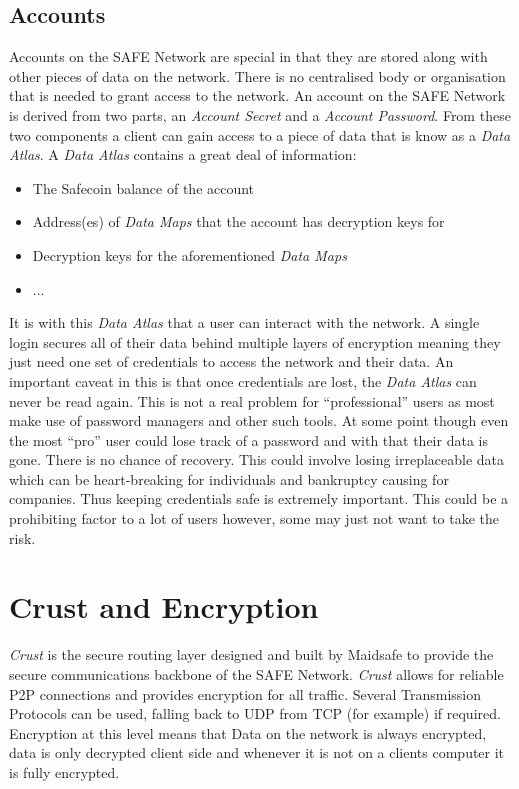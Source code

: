 \subsection{Accounts}

Accounts on the SAFE Network are special in that they are stored along with other pieces of data on the network. There is no centralised body or organisation that is needed to grant access to the network. An account on the SAFE Network is derived from two parts, an \textit{Account Secret} and a \textit{Account Password}. From these two components a client can gain access to a piece of data that is know as a \textit{Data Atlas}. A \textit{Data Atlas} contains a great deal of information:

\begin{itemize}
	\item The Safecoin balance of the account
	\item Address(es) of \textit{Data Maps} that the account has decryption keys for
	\item Decryption keys for the aforementioned \textit{Data Maps}
	\item ...
\end{itemize}
	
It is with this \textit{Data Atlas} that a user can interact with the network. A single login secures all of their data behind multiple layers of encryption meaning they just need one set of credentials to access the network and their data. An important caveat in this is that once credentials are lost, the \textit{Data Atlas} can never be read again. This is not a real problem for ``professional'' users as most make use of password managers and other such tools. At some point though even the most ``pro'' user could lose track of a password and with that their data is gone. There is no chance of recovery. This could involve losing irreplaceable data which can be heart-breaking for individuals and bankruptcy causing for companies. Thus keeping credentials safe is extremely important. This could be a prohibiting factor to a lot of users however, some may just not want to take the risk.

\section{Crust and Encryption}

\textit{Crust} is the secure routing layer designed and built by Maidsafe to provide the secure communications backbone of the SAFE Network. \textit{Crust} allows for reliable P2P connections and provides encryption for all traffic. Several Transmission Protocols can be used, falling back to UDP from TCP (for example) if required. Encryption at this level means that Data on the network is always encrypted, data is only decrypted client side and whenever it is not on a clients computer it is fully encrypted.

